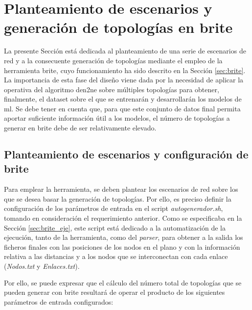 \section{Planteamiento de escenarios y generación de topologías en \acrshort{brite}}
\label{sec:ejebrite}

La presente Sección está dedicada al planteamiento de una serie de escenarios de red y a la consecuente generación de topologías mediante el empleo de la herramienta \gls{brite}, cuyo funcionamiento ha sido descrito en la Sección \ref{sec:brite}. La importancia de esta fase del diseño viene dada por la necesidad de aplicar la operativa del algoritmo \gls{den2ne} sobre múltiples topologías para obtener, finalmente, el dataset sobre el que se entrenarán y desarrollarán los modelos de \gls{ml}. Se debe tener en cuenta que, para que este conjunto de datos final permita aportar suficiente información útil a los modelos, el número de topologías a generar en \gls{brite} debe de ser relativamente elevado.

\vspace{3mm}

\subsection{Planteamiento de escenarios y configuración de \acrshort{brite}}
\label{sec:conftopo}

Para emplear la herramienta, se deben plantear los escenarios de red sobre los que se desea basar la generación de topologías. Por ello, es preciso definir la configuración de los parámetros de entrada en el script \textit{autogenerador.sh}, tomando en consideración el requerimiento anterior. Como se especificaba en la Sección \ref{sec:brite_eje}, este script está dedicado a la automatización de la ejecución, tanto de la herramienta, como del \textit{parser}, para obtener a la salida los ficheros finales con las posiciones de los nodos en el plano y con la información relativa a las distancias y a los nodos que se interconectan con cada enlace (\textit{Nodos.txt} y \textit{Enlaces.txt}). 

\vspace{3mm}

Por ello, se puede expresar que el cálculo del número total de topologías que se pueden generar con \gls{brite} resultará de operar el producto de los siguientes parámetros de entrada configurados:

